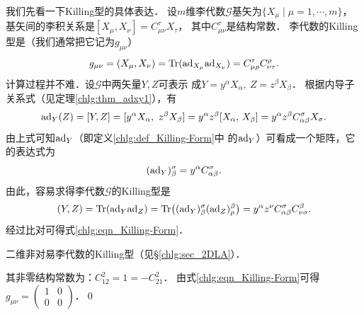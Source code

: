 我们先看一下Killing型的具体表达．
设$m$维李代数$\mathscr{G}$基矢为$\{X_\mu \mid \mu=1,\cdots,m\}$，
基矢间的李积关系是$[X_\mu, X_\nu]=C^\tau_{\mu\nu} X_\tau$，
其中$C^\tau_{\mu\nu}$是结构常数．
李代数的Killing型是（我们通常把它记为$g_{\mu\nu}$）
\begin{equation}\label{chlg:eqn_Killing-Form}
    g_{\mu\nu} = (X_\mu, X_\nu )= {\rm Tr}({\rm ad}_{X_\mu}  {\rm ad}_{X_\nu} )
    = C^\tau_{\mu\rho} C^\rho_{\nu\tau} .
\end{equation}
计算过程并不难．设$\mathscr{G}$中两矢量$Y,Z$可表示
成$Y=y^\alpha X_\alpha,\  Z= z^\beta X_\beta$．
根据内导子关系式（见定理\ref{chlg:thm_adxy1}），有
\begin{equation}
    {\rm ad}_Y(Z)=[Y,Z]=[y^\alpha X_\alpha,\  z^\beta X_\beta]
    = y^\alpha z^\beta[ X_\alpha,\, X_\beta]
    = y^\alpha z^\beta C^\sigma_{\alpha\beta} X_\sigma .
\end{equation}
由上式可知${\rm ad}_Y$（即定义\ref{chlg:def_Killing-Form}中
的${\rm ad}_Y$）可看成一个矩阵，它的表达式为
\begin{equation}
    ({\rm ad}_Y)^\sigma _\beta = y^\alpha C^\sigma_{\alpha\beta} .
\end{equation}
由此，容易求得李代数$\mathscr{G}$的Killing型是
\begin{equation}
    (Y,Z)={\rm Tr}({\rm ad}_Y  {\rm ad}_Z ) 
    = {\rm Tr}\bigl(({\rm ad}_Y)^\sigma _\beta ({\rm ad}_Z)^\beta _\rho \bigr)
    =  y^\alpha z^\nu C^\sigma_{\alpha\beta}  C^\beta_{\nu\sigma} .
\end{equation}
经过比对可得式\eqref{chlg:eqn_Killing-Form}．

\begin{example}
	二维非对易李代数的Killing型（见\S\ref{chlg:sec_2DLA}）．
\end{example}

其非零结构常数为：$C^2_{12}=1=-C^2_{21}$．
由式\eqref{chlg:eqn_Killing-Form}可得
$g_{\mu\nu}=\left(\begin{smallmatrix} 1 & 0 \\ 0 & 0\end{smallmatrix}\right)$．\qed


